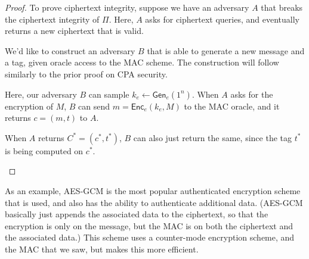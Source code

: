 \documentclass[12pt]{tufte-book}
\begin{document}
\begin{proof}
    To prove ciphertext integrity, suppose we have an adversary $A$ that breaks the ciphertext integrity of $\Pi$. Here, $A$ asks for ciphertext queries, and eventually returns a new ciphertext that is valid.

    We'd like to construct an adversary $B$ that is able to generate a new message and a tag, given oracle access to the MAC scheme. The construction will follow similarly to the prior proof on CPA security.

    Here, our adversary $B$ can sample $k_e \gets \mathsf{Gen}_e(1^n)$. When $A$ asks for the encryption of $M$, $B$ can send $m = \mathsf{Enc}_e(k_e, M)$ to the MAC oracle, and it returns $c = (m, t)$ to $A$.

    When $A$ returns $C^* = (c^*, t^*)$, $B$ can also just return the same, since the tag $t^*$ is being computed on $c^*$.

    \begin{center}
    \end{center}
\end{proof}

As an example, AES-GCM is the most popular authenticated encryption scheme that is used, and also has the ability to authenticate additional data. (AES-GCM basically just appends the associated data to the ciphertext, so that the encryption is only on the message, but the MAC is on both the ciphertext and the associated data.) This scheme uses a counter-mode encryption scheme, and the MAC that we saw, but makes this more efficient.
\end{document}
